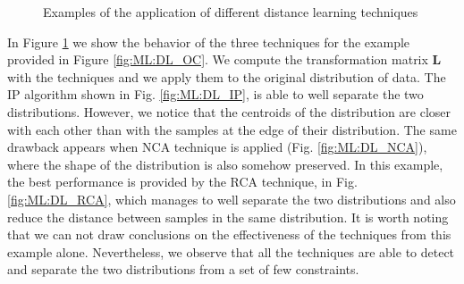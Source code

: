 \begin{figure}[tb]
	\centering
	 \hfil
	 \hfil		
	\caption{Examples of the application of different distance learning techniques}
	\label{fig:ML:DL_IPNCARCA}         
\end{figure}

In Figure \ref{fig:ML:DL_IPNCARCA} we show the behavior of the three techniques for the example provided in Figure \ref{fig:ML:DL_OC}. We compute the transformation matrix $\mathbf{L}$ with the techniques and we apply them to the original distribution of data.  The IP algorithm shown in Fig. \ref{fig:ML:DL_IP}, is able to well separate the two distributions. However, we notice that the centroids of the distribution are closer with each other than with the samples at the edge of their distribution. The same drawback appears when NCA technique is applied (Fig. \ref{fig:ML:DL_NCA}), where the shape of the distribution is also somehow preserved. In this example, the best performance is provided by the RCA technique, in Fig. \ref{fig:ML:DL_RCA}, which manages to well separate the two distributions and also reduce the distance between samples in the same distribution. It is worth noting that we can not draw conclusions on the effectiveness of the techniques from this example alone. Nevertheless, we observe that all the techniques are able to detect and separate the two distributions from a set of few constraints.

